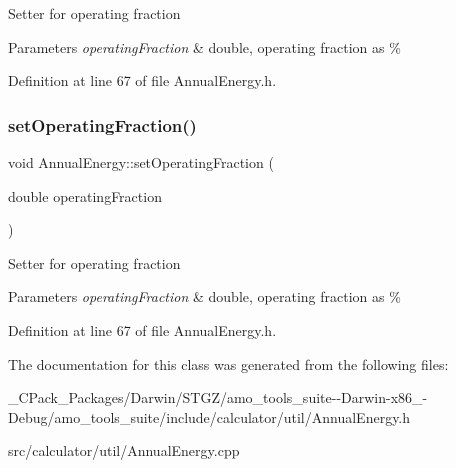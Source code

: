 Setter for operating fraction


\begin{DoxyParams}{Parameters}
{\em operating\+Fraction} & double, operating fraction as \% \\
\hline
\end{DoxyParams}


Definition at line 67 of file Annual\+Energy.\+h.

\mbox{\label{class_annual_energy_a5c127c7d5e2a5e4f50559f8b546e8998}} 
\subsubsection{\texorpdfstring{set\+Operating\+Fraction()}{setOperatingFraction()}\hspace{0.1cm}{\footnotesize\ttfamily [3/3]}}
{\footnotesize\ttfamily void Annual\+Energy\+::set\+Operating\+Fraction (\begin{DoxyParamCaption}\item[{double}]{operating\+Fraction }\end{DoxyParamCaption})\hspace{0.3cm}{\ttfamily [inline]}}

Setter for operating fraction


\begin{DoxyParams}{Parameters}
{\em operating\+Fraction} & double, operating fraction as \% \\
\hline
\end{DoxyParams}


Definition at line 67 of file Annual\+Energy.\+h.



The documentation for this class was generated from the following files\+:\begin{DoxyCompactItemize}
\item 
\+\_\+\+C\+Pack\+\_\+\+Packages/\+Darwin/\+S\+T\+G\+Z/amo\+\_\+tools\+\_\+suite-\/-\/\+Darwin-\/x86\+\_-\/\+Debug/amo\+\_\+tools\+\_\+suite/include/calculator/util/Annual\+Energy.\+h\item 
src/calculator/util/Annual\+Energy.\+cpp\end{DoxyCompactItemize}
